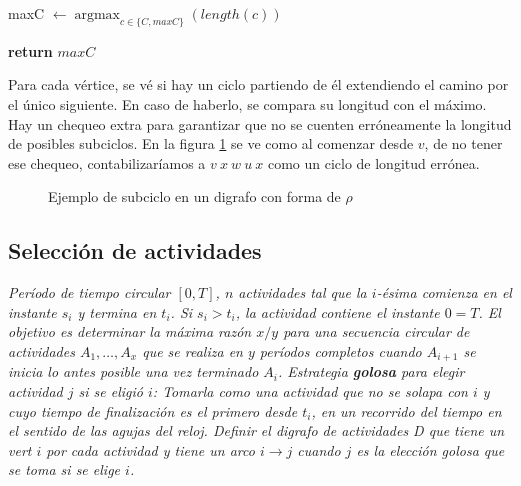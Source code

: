 \documentclass[12pt, a4paper]{report}
\DeclareMathOperator*{\argmax}{argmax}
\theoremstyle{definition} %
\begin{document}
\begin{enumerate}[a)]
\begin{algorithm}[H]
\begin{algorithmic}[1]
                    \State maxC $\gets \argmax_{c \in \{C, maxC\}}(length(c))$
                \EndFor

                \State \textbf{return} $maxC$
            \EndFunction
        \end{algorithmic}
    \end{algorithm}

    Para cada vértice, se vé si hay un ciclo partiendo de él extendiendo el camino por el único siguiente. En caso de haberlo, se compara su longitud con el máximo. Hay un chequeo extra para garantizar que no se cuenten erróneamente la longitud de posibles subciclos. En la figura \ref{1/subciclos} se ve como al comenzar desde $v$, de no tener ese chequeo, contabilizaríamos a $v\ x\ w\ u\ x$ como un ciclo de longitud errónea.

    \begin{figure}[H]
        \centering
        \caption{Ejemplo de subciclo en un digrafo con forma de $\rho$}
        \label{1/subciclos}
    \end{figure}


\end{enumerate}

\subsection*{Selección de actividades}

\textit{Período de tiempo circular $[0, T]$, $n$ actividades tal que la $i$-ésima comienza en el instante $s_i$ y termina en $t_i$. Si $s_i > t_i$, la actividad contiene el instante $0=T$. El objetivo es determinar la máxima razón $x / y$ para una secuencia circular de actividades $A_1, \ldots, A_x$ que se realiza en $y$ períodos completos cuando $A_{i+1}$ se inicia lo antes posible una vez terminado $A_i$. Estrategia \textbf{golosa} para elegir actividad $j$ si se eligió $i$: Tomarla como una actividad que no se solapa con $i$ y cuyo tiempo de finalización es el primero desde $t_i$, en un recorrido del tiempo en el sentido de las agujas del reloj. Definir el digrafo de actividades D que tiene un vert $i$ por cada actividad y tiene un arco $i \to j$ cuando $j$ es la elección golosa que se toma si se elige $i$.}
\end{document}
